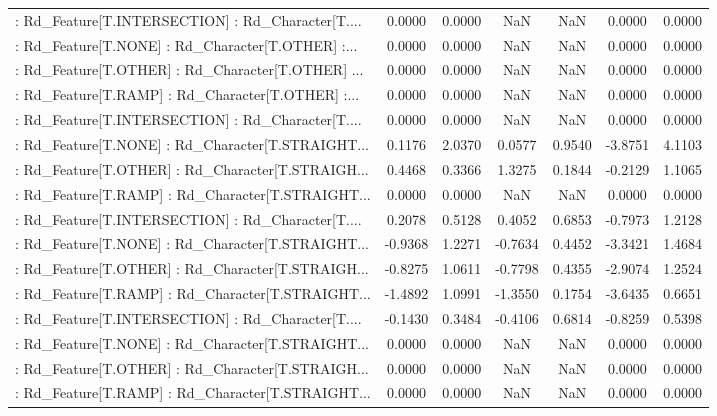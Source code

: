 \begin{longtable}{p{4cm}cccccc}
 : Rd\_Feature[T.INTERSECTION] : Rd\_Character[T.... &  0.0000 &    0.0000 &     NaN &          NaN &  0.0000 &  0.0000 \\
 : Rd\_Feature[T.NONE] : Rd\_Character[T.OTHER] :... &  0.0000 &    0.0000 &     NaN &          NaN &  0.0000 &  0.0000 \\
 : Rd\_Feature[T.OTHER] : Rd\_Character[T.OTHER] ... &  0.0000 &    0.0000 &     NaN &          NaN &  0.0000 &  0.0000 \\
 : Rd\_Feature[T.RAMP] : Rd\_Character[T.OTHER] :... &  0.0000 &    0.0000 &     NaN &          NaN &  0.0000 &  0.0000 \\
 : Rd\_Feature[T.INTERSECTION] : Rd\_Character[T.... &  0.0000 &    0.0000 &     NaN &          NaN &  0.0000 &  0.0000 \\
 : Rd\_Feature[T.NONE] : Rd\_Character[T.STRAIGHT... &  0.1176 &    2.0370 &  0.0577 &       0.9540 & -3.8751 &  4.1103 \\
 : Rd\_Feature[T.OTHER] : Rd\_Character[T.STRAIGH... &  0.4468 &    0.3366 &  1.3275 &       0.1844 & -0.2129 &  1.1065 \\
 : Rd\_Feature[T.RAMP] : Rd\_Character[T.STRAIGHT... &  0.0000 &    0.0000 &     NaN &          NaN &  0.0000 &  0.0000 \\
 : Rd\_Feature[T.INTERSECTION] : Rd\_Character[T.... &  0.2078 &    0.5128 &  0.4052 &       0.6853 & -0.7973 &  1.2128 \\
 : Rd\_Feature[T.NONE] : Rd\_Character[T.STRAIGHT... & -0.9368 &    1.2271 & -0.7634 &       0.4452 & -3.3421 &  1.4684 \\
 : Rd\_Feature[T.OTHER] : Rd\_Character[T.STRAIGH... & -0.8275 &    1.0611 & -0.7798 &       0.4355 & -2.9074 &  1.2524 \\
 : Rd\_Feature[T.RAMP] : Rd\_Character[T.STRAIGHT... & -1.4892 &    1.0991 & -1.3550 &       0.1754 & -3.6435 &  0.6651 \\
 : Rd\_Feature[T.INTERSECTION] : Rd\_Character[T.... & -0.1430 &    0.3484 & -0.4106 &       0.6814 & -0.8259 &  0.5398 \\
 : Rd\_Feature[T.NONE] : Rd\_Character[T.STRAIGHT... &  0.0000 &    0.0000 &     NaN &          NaN &  0.0000 &  0.0000 \\
 : Rd\_Feature[T.OTHER] : Rd\_Character[T.STRAIGH... &  0.0000 &    0.0000 &     NaN &          NaN &  0.0000 &  0.0000 \\
 : Rd\_Feature[T.RAMP] : Rd\_Character[T.STRAIGHT... &  0.0000 &    0.0000 &     NaN &          NaN &  0.0000 &  0.0000 \\

\end{longtable}
